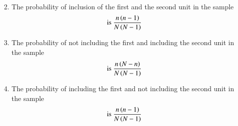 \begin{enumerate}[label=\thesection.\arabic*.,ref=\thesection.\theenumi]
\begin{enumerate}
\begin{align}
    \end{align}
    \item The probability of inclusion of the first and the second unit in the sample
    \begin{align}
        \text{ is } \frac{n \left(n-1\right)}{N \left(N-1\right)}
    \end{align}
    \item The probability of not including the first and including the second unit in the sample
    \begin{align}
        \text{ is } \frac{n \left(N-n\right)}{N \left(N-1\right)}
    \end{align}
    \item The probability of including the first and not including the second unit in the sample
    \begin{align}
        \text{ is } \frac{n \left(n-1\right)}{N \left(N-1\right)}
    \end{align}
\end{enumerate}
%
\solution


% 

\end{enumerate}
